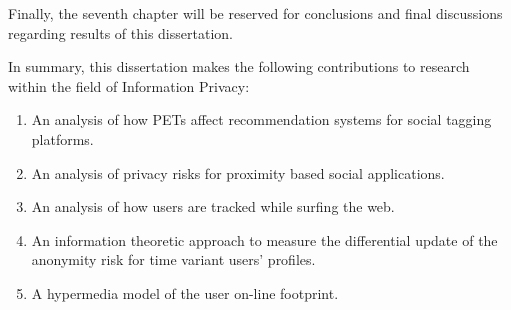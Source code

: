 Finally, the seventh chapter will be reserved for conclusions and final discussions regarding results of this dissertation.

In summary, this dissertation makes the following contributions to research within the field of Information Privacy:

\begin{enumerate}
    \item An analysis of how PETs affect recommendation systems for social tagging platforms.
    \item An analysis of privacy risks for proximity based social applications.
    \item An analysis of how users are tracked while surfing the web.
    \item An information theoretic approach to measure the differential update of the anonymity risk for time variant users’ profiles.
    \item A hypermedia model of the user on-line footprint.
\end{enumerate}